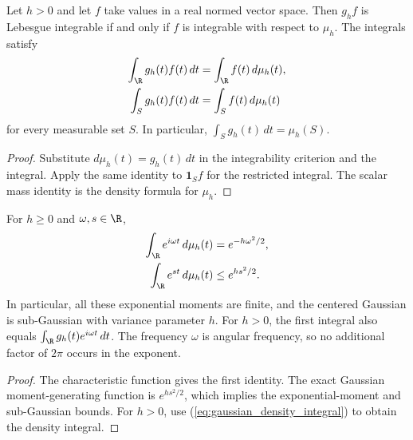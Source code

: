 \begin{theorem}
    \label{thm:gaussian_density_integrals}
    \leanok
    Let $h>0$ and let $f$ take values in a real normed vector space.
    Then $g_hf$ is Lebesgue integrable if and only if $f$ is integrable
    with respect to $\mu_h$. The integrals satisfy
    \begin{align}
        \int_{\R}g_h(t)f(t)\,dt&=\int_{\R}f(t)\,d\mu_h(t),
        \label{eq:gaussian_density_integral}\\
        \int_S g_h(t)f(t)\,dt&=\int_S f(t)\,d\mu_h(t) \notag
    \end{align}
    for every measurable set $S$. In particular,
    $\int_S g_h(t)\,dt=\mu_h(S)$.
\end{theorem}
\begin{proof}\leanok
    Substitute $d\mu_h(t)=g_h(t)\,dt$ in the integrability criterion and
    the integral. Apply the same identity to $\mathbf 1_Sf$ for the
    restricted integral. The scalar mass identity is the density formula
    for $\mu_h$.
\end{proof}

\begin{theorem}
    \label{thm:gaussian_characteristic}
    \leanok
    For $h\ge0$ and $\omega,s\in\R$,
    \begin{align}
        \int_{\R}e^{i\omega t}\,d\mu_h(t)&=e^{-h\omega^2/2},
        \label{eq:gaussian_characteristic}\\
        \int_{\R}e^{st}\,d\mu_h(t)&\le e^{hs^2/2}. \notag
    \end{align}
    In particular, all these exponential moments are finite, and the
    centered Gaussian is sub-Gaussian with variance parameter $h$.
    For $h>0$, the first integral also equals
    $\int_{\R}g_h(t)e^{i\omega t}\,dt$.
    The frequency $\omega$ is angular frequency, so no additional factor
    of $2\pi$ occurs in the exponent.
\end{theorem}
\begin{proof}\leanok
    The characteristic function gives the first identity. The exact
    Gaussian moment-generating function is $e^{hs^2/2}$, which implies
    the exponential-moment and sub-Gaussian bounds. For $h>0$, use
    (\ref{eq:gaussian_density_integral}) to obtain the density integral.
\end{proof}

